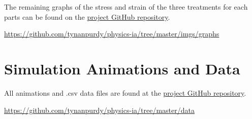 \documentclass[12pt, letterpaper]{article}
\begin{document}
\begin{singlespace}
The remaining graphs of the stress and strain of the three treatments for each parts can be found on the \href{https://github.com/tynanpurdy/physics-ia/tree/master/imgs/graphs}{project GitHub repository}.

\url{https://github.com/tynanpurdy/physics-ia/tree/master/imgs/graphs} 

\section{Simulation Animations and Data}
\label{ap:data}

All animations and .csv data files are found at the \href{https://github.com/tynanpurdy/physics-ia/tree/master/data}{project GitHub repository}.

\url{https://github.com/tynanpurdy/physics-ia/tree/master/data}

\end{singlespace}
\end{document}
